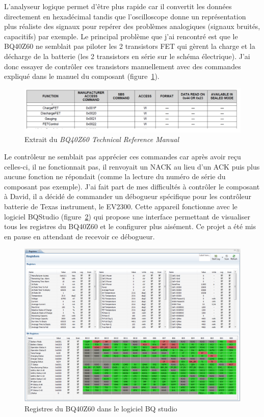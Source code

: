 \documentclass[a4paper, 12pt]{report}
\begin{document}
L’analyseur logique permet d’être plus rapide car il convertit les données directement en hexadécimal tandis que l’oscilloscope donne un représentation plus réaliste des signaux pour repérer des problèmes analogiques (signaux bruités, capacitifs) par exemple.
Le principal problème que j’ai rencontré est que le BQ40Z60 ne semblait pas piloter les 2 transistors FET qui gèrent la charge et la décharge de la batterie (les 2 transistors en série sur le schéma électrique).
J’ai donc essayer de contrôler ces transistors manuellement avec des commandes expliqué dans le manuel du composant (figure~\ref{fig:BQ40Z60_manual_excerpt}).

\begin{figure}[H]
\centering
\includegraphics[scale=0.82]{figures/screenshots/BQ40Z60_manual_excerpt.png}
\caption{Extrait du \emph{BQ40Z60 Technical Reference Manual}\cite{BQ40Z60_tech_manual}} 
\label{fig:BQ40Z60_manual_excerpt}
\end{figure}

Le contrôleur ne semblait pas apprécier ces commandes car après avoir reçu celles-ci, il ne fonctionnait pas, il renvoyait un NACK au lieu d’un ACK puis plus aucune fonction ne répondait (comme la lecture du numéro de série du composant pas exemple).
J’ai fait part de mes difficultés à contrôler le composant à David, il a décidé de commander un débogueur spécifique pour les contrôleur batterie de Texas instrument, le EV2300. Cette appareil fonctionne avec le logiciel BQStudio (figure~\ref{fig:BQ40Z60_registers}) qui propose une interface permettant de visualiser tous les registres du BQ40Z60 et le configurer plus aisément. Ce projet a été mis en pause en attendant de recevoir ce débogueur.

\begin{figure}[H]
\centering
\includegraphics[scale=0.4]{figures/screenshots/BQ40Z60_registers.png}
\caption{Registres du BQ40Z60 dans le logiciel BQ studio}
\label{fig:BQ40Z60_registers}
\end{figure}
\end{document}

